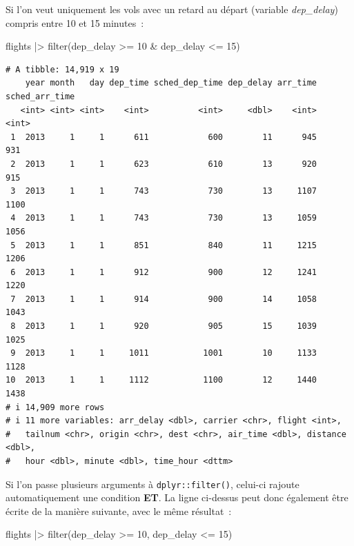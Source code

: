 \documentclass[
  letterpaper,
  DIV=11,
  numbers=noendperiod,
  oneside]{scrreprt}
\newenvironment{Shaded}{\begin{snugshade}}{\end{snugshade}}
\newcommand{\DecValTok}[1]{\textcolor[rgb]{0.68,0.00,0.00}{#1}}
\newcommand{\FunctionTok}[1]{\textcolor[rgb]{0.28,0.35,0.67}{#1}}
\newcommand{\NormalTok}[1]{\textcolor[rgb]{0.00,0.23,0.31}{#1}}
\newcommand{\SpecialCharTok}[1]{\textcolor[rgb]{0.37,0.37,0.37}{#1}}
\begin{document}
Si l'on veut uniquement les vols avec un retard au départ (variable
\emph{dep\_delay}) compris entre 10 et 15 minutes~:

\begin{Shaded}
\begin{Highlighting}[]
\NormalTok{flights }\SpecialCharTok{|\textgreater{}} 
  \FunctionTok{filter}\NormalTok{(dep\_delay }\SpecialCharTok{\textgreater{}=} \DecValTok{10} \SpecialCharTok{\&}\NormalTok{ dep\_delay }\SpecialCharTok{\textless{}=} \DecValTok{15}\NormalTok{)}
\end{Highlighting}
\end{Shaded}

\begin{verbatim}
# A tibble: 14,919 x 19
    year month   day dep_time sched_dep_time dep_delay arr_time sched_arr_time
   <int> <int> <int>    <int>          <int>     <dbl>    <int>          <int>
 1  2013     1     1      611            600        11      945            931
 2  2013     1     1      623            610        13      920            915
 3  2013     1     1      743            730        13     1107           1100
 4  2013     1     1      743            730        13     1059           1056
 5  2013     1     1      851            840        11     1215           1206
 6  2013     1     1      912            900        12     1241           1220
 7  2013     1     1      914            900        14     1058           1043
 8  2013     1     1      920            905        15     1039           1025
 9  2013     1     1     1011           1001        10     1133           1128
10  2013     1     1     1112           1100        12     1440           1438
# i 14,909 more rows
# i 11 more variables: arr_delay <dbl>, carrier <chr>, flight <int>,
#   tailnum <chr>, origin <chr>, dest <chr>, air_time <dbl>, distance <dbl>,
#   hour <dbl>, minute <dbl>, time_hour <dttm>
\end{verbatim}

Si l'on passe plusieurs arguments à \texttt{dplyr::filter()}, celui-ci
rajoute automatiquement une condition \textbf{ET}. La ligne ci-dessus
peut donc également être écrite de la manière suivante, avec le même
résultat~:

\begin{Shaded}
\begin{Highlighting}[]
\NormalTok{flights }\SpecialCharTok{|\textgreater{}} 
  \FunctionTok{filter}\NormalTok{(dep\_delay }\SpecialCharTok{\textgreater{}=} \DecValTok{10}\NormalTok{, dep\_delay }\SpecialCharTok{\textless{}=} \DecValTok{15}\NormalTok{)}
\end{Highlighting}
\end{Shaded}
\end{document}
